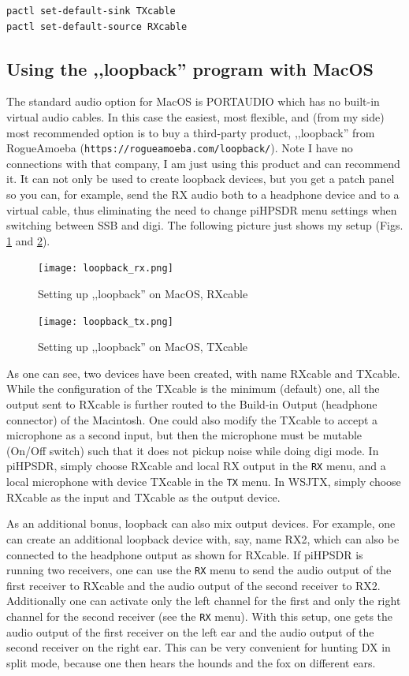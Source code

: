\documentclass[12pt]{book}
\def\bltt#1{\texttt{\color{blue}#1}}
\def\pH{pi\-HPSDR\xspace}
\begin{document}
\begin{verbatim}
pactl set-default-sink TXcable
pactl set-default-source RXcable
\end{verbatim}

\subsection[MacOS: LoopBack]{Using the ,,loopback'' program with MacOS}
The standard audio option for MacOS is PORTAUDIO which has no built-in virtual
audio cables. In this case
the easiest, most flexible, and (from my side) most recommended option is
to buy a third-party product,  ,,loopback'' from RogueAmoeba
(\texttt{https://rogueamoeba.com/loopback/}).
Note I have no connections with that company, I am just using this product and
can recommend it. It can not only be used to create loopback devices, but you get
a patch panel so you can, for example, send the RX audio both to a headphone device
and to a virtual cable, thus eliminating the need to change \pH menu settings
when switching between SSB and digi. The following picture just shows my setup
(Figs. \ref{fig:loopback_rx} and \ref{fig:loopback_tx}).

\begin{figure}[ht!]
\center
\texttt{[image: loopback\_rx.png]}
\caption{Setting up ,,loopback'' on MacOS, RXcable}
\label{fig:loopback_rx}
\end{figure}

\begin{figure}[ht!]
\center
\texttt{[image: loopback\_tx.png]}
\caption{Setting up ,,loopback'' on MacOS, TXcable}
\label{fig:loopback_tx}
\end{figure}

As one can see, two devices have been created, with name RXcable and TXcable.
While the configuration of the TXcable is the minimum (default) one, all the
output sent to RXcable is further routed to the Build-in Output (headphone
connector) of the Macintosh. One could also modify the TXcable to accept a
microphone as a second input, but then the microphone must be mutable
(On/Off switch) such that it does not pickup noise while doing digi mode.
In \pH, simply choose RXcable and local RX output in the \bltt{RX} menu,
and a local microphone with device TXcable in the \bltt{TX} menu. In WSJTX,
simply choose RXcable as the input and TXcable as the output device.

As an additional bonus, loopback can also mix output devices. For example, one can create
an additional loopback device with, say, name RX2, which can also be connected to
the headphone output as shown for RXcable. If \pH is running two receivers,
one can use the \bltt{RX} menu to send the audio output of the first receiver to RXcable
and the audio output of the second receiver to RX2. Additionally one can activate only
the left channel for the first and only the right channel for the second receiver
(see the \bltt{RX} menu). With this setup,
one gets the audio output of the first receiver on the left ear and the audio output of
the second receiver on the right ear. This can be very convenient for hunting DX in split mode,
because one then hears the hounds and the fox on different ears.
\end{document}
